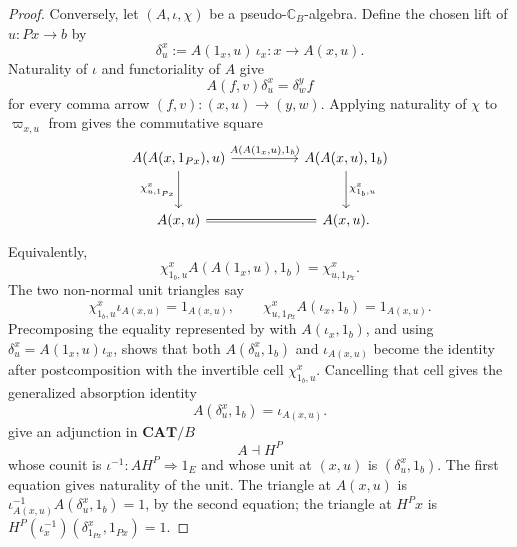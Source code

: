 \documentclass[11pt]{article}
\theoremstyle{plain}
\theoremstyle{definition}
\theoremstyle{remark}
\newcommand{\CAT}{\mathbf{CAT}}
\newcommand{\C}{\mathbb{C}}
\numberwithin{equation}{section}
\begin{document}
\begin{proof}
Conversely, let $(A,\iota,\chi)$ be a pseudo-$\C_B$-algebra.  Define
the chosen lift of $u\colon Px\to b$ by
\begin{equation}
  \delta^x_u:=A(1_x,u)\,\iota_x
  \colon x\longrightarrow A(x,u).
  \label{eq:fixed-base-lift-from-pseudoaction}
\end{equation}
Naturality of $\iota$ and functoriality of $A$ give
\begin{equation}
  A(f,v)\delta^x_u=\delta^y_wf
  \label{eq:fixed-base-unit-naturality}
\end{equation}
for every comma arrow $(f,v)\colon(x,u)\to(y,w)$.  Applying naturality
of $\chi$ to $\varpi_{x,u}$ from
 gives the commutative square
\begin{equation}
\begin{tikzcd}[column sep=huge,row sep=large]
A(A(x,1_{Px}),u)
  \arrow[r,"{A(A(1_x,u),1_b)}"]
  \arrow[d,"{\chi^x_{u,1_{Px}}}"']
& A(A(x,u),1_b)
  \arrow[d,"{\chi^x_{1_b,u}}"] \\
A(x,u) \arrow[r,equal]
& A(x,u).
\end{tikzcd}
\label{eq:fixed-base-absorption-naturality}
\end{equation}
Equivalently,
\begin{equation*}
  \chi^x_{1_b,u}A(A(1_x,u),1_b)=\chi^x_{u,1_{Px}}.
\end{equation*}
The two non-normal unit triangles say
\begin{equation*}
  \chi^x_{1_b,u}\iota_{A(x,u)}=1_{A(x,u)},
  \qquad
  \chi^x_{u,1_{Px}}A(\iota_x,1_b)=1_{A(x,u)}.
\end{equation*}
Precomposing the equality represented by
 with
$A(\iota_x,1_b)$, and using
$\delta^x_u=A(1_x,u)\iota_x$, shows that both
$A(\delta^x_u,1_b)$ and $\iota_{A(x,u)}$ become the identity after
postcomposition with the invertible cell $\chi^x_{1_b,u}$.
Cancelling that cell gives the generalized absorption identity
\begin{equation}
  A(\delta^x_u,1_b)=\iota_{A(x,u)}.
  \label{eq:fixed-base-pseudo-absorption}
\end{equation}
give an adjunction in $\CAT/B$
\begin{equation}
  A\dashv H^P
  \label{eq:fixed-base-pseudo-adjunction}
\end{equation}
whose counit is $\iota^{-1}\colon AH^P\Rightarrow1_E$ and whose unit
at $(x,u)$ is $(\delta^x_u,1_b)$.  The first equation gives naturality
of the unit.  The triangle at $A(x,u)$ is
$\iota^{-1}_{A(x,u)}A(\delta^x_u,1_b)=1$, by the second equation; the
triangle at $H^Px$ is
$H^P(\iota_x^{-1})(\delta^x_{1_{Px}},1_{Px})=1$.


\end{proof}
\end{document}
